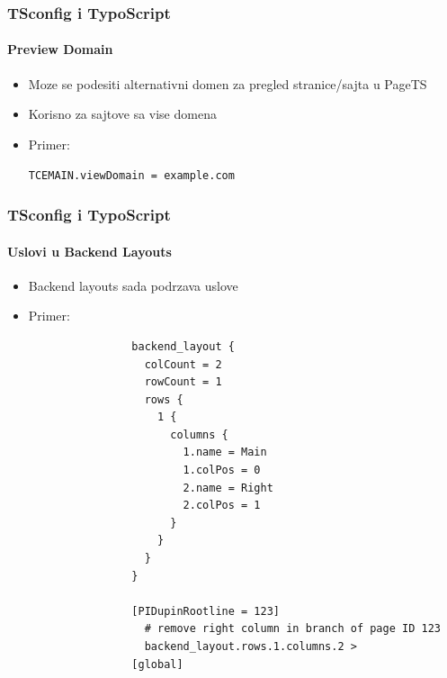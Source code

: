 
\begin{frame}[fragile]
	\frametitle{TSconfig i TypoScript}
	\framesubtitle{Preview Domain}

	\begin{itemize}

		\item Moze se podesiti alternativni domen za pregled stranice/sajta u PageTS
		\item Korisno za sajtove sa vise domena
		\item Primer:

			\lstinline!TCEMAIN.viewDomain = example.com!

	\end{itemize}

\end{frame}


\begin{frame}[fragile]
	\frametitle{TSconfig i TypoScript}
	\framesubtitle{Uslovi u Backend Layouts}

	\begin{itemize}

		\item Backend layouts sada podrzava uslove
		\item Primer:

			\lstset{
				basicstyle=\tiny\ttfamily
			}

			\begin{lstlisting}
				backend_layout {
				  colCount = 2
				  rowCount = 1
				  rows {
				    1 {
				      columns {
				        1.name = Main
				        1.colPos = 0
				        2.name = Right
				        2.colPos = 1
				      }
				    }
				  }
				}

				[PIDupinRootline = 123]
				  # remove right column in branch of page ID 123
				  backend_layout.rows.1.columns.2 >
				[global]
			\end{lstlisting}

	\end{itemize}

\end{frame}

